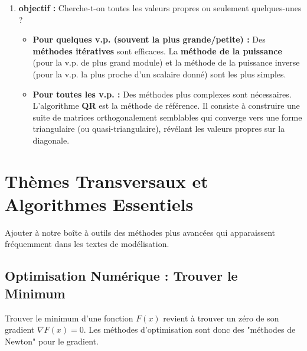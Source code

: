 \begin{proposition}[Checklist pour $Ax=\lambda x$]
    \begin{enumerate}
        \item \textbf{objectif :} Cherche-t-on toutes les valeurs propres ou seulement quelques-unes ?
            \begin{itemize}
                \item \textbf{Pour quelques v.p. (souvent la plus grande/petite) :} Des \textbf{méthodes itératives} sont efficaces. La \textbf{méthode de la puissance} (pour la v.p. de plus grand module) et la méthode de la puissance inverse (pour la v.p. la plus proche d'un scalaire donné) sont les plus simples.
                \item \textbf{Pour toutes les v.p. :} Des méthodes plus complexes sont nécessaires. L'algorithme \textbf{QR} est la méthode de référence. Il consiste à construire une suite de matrices orthogonalement semblables qui converge vers une forme triangulaire (ou quasi-triangulaire), révélant les valeurs propres sur la diagonale.
            \end{itemize}
    \end{enumerate}
\end{proposition}

\section{Thèmes Transversaux et Algorithmes Essentiels}

\begin{objectif}
    Ajouter à notre boîte à outils des méthodes plus avancées qui apparaissent fréquemment dans les textes de modélisation.
\end{objectif}

\subsection{Optimisation Numérique : Trouver le Minimum}

\begin{remark}
    Trouver le minimum d'une fonction $F(x)$ revient à trouver un zéro de son gradient $\nabla F(x)=0$. Les méthodes d'optimisation sont donc des "méthodes de Newton" pour le gradient.
\end{remark}

